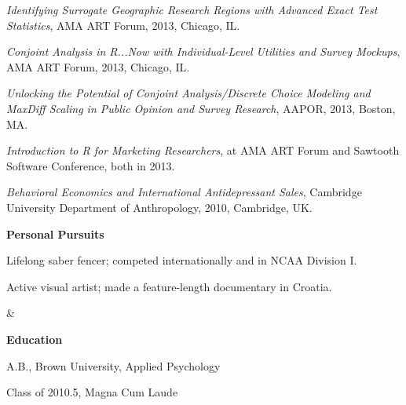 \documentclass{res}
\begin{document}
{\begin{resume}
\begin{minipage}{7.6in}
\begin{list}{}{%
     \setlength{\labelwidth}{0pt}%
     \setlength{\itemsep}{-2pt}%
     \setlength{\leftmargin}{1em}%
     \setlength{\itemindent}{-1em}%
   }
\item {\it Identifying Surrogate Geographic Research Regions with Advanced Exact Test Statistics}, AMA ART Forum, 2013, Chicago, IL.%
\item {\it Conjoint Analysis in R...Now with Individual-Level Utilities and Survey Mockups}, AMA ART Forum, 2013, Chicago, IL.%
\item {\it Unlocking the Potential of Conjoint Analysis/Discrete Choice Modeling and MaxDiff Scaling in Public Opinion and Survey Research}, AAPOR, 2013, Boston, MA.
\item {\it Introduction to R for Marketing Researchers}, at AMA ART Forum and Sawtooth Software Conference, both in 2013.
\item {\it Behavioral Economics and International Antidepressant Sales}, Cambridge University Department of Anthropology, 2010, Cambridge, UK.
\end{list}

\vspace{8mm}

\begin{tabular}{{}{}}
\hspace{-2.75mm}
{\begin{minipage}{4.7in}
\textbf{Personal Pursuits\hspace{2mm}}\hrulefill
\vspace{1.5mm}
\begin{list}{}{\leftmargin=0em}\itemsep-2pt
\item Lifelong saber fencer; competed internationally and in NCAA Division I.
\item Active visual artist; made a feature-length documentary in Croatia.
\end{list}
\end{minipage}}
&
{\begin{minipage}{2.75in}
\textbf{Education\hspace{2mm}}\hrulefill
\vspace{1.5mm}
\begin{list}{}{\leftmargin=0em}\itemsep-2pt
\item A.B., Brown University, Applied Psychology
\item Class of 2010.5, Magna Cum Laude
\end{list}
\end{minipage}}
\end{tabular}


\end{minipage}
\end{resume}}
\end{document}
